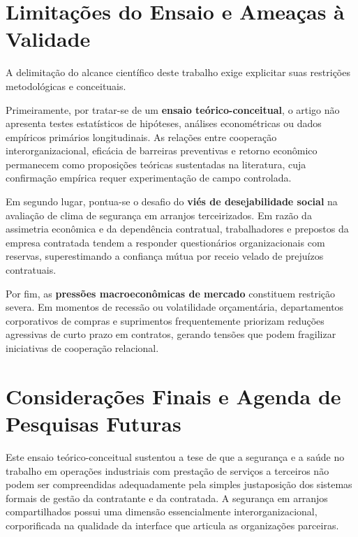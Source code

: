 \documentclass[12pt,a4paper]{article}
\begin{document}
\section{Limitações do Ensaio e Ameaças à Validade}

A delimitação do alcance científico deste trabalho exige explicitar suas restrições metodológicas e conceituais.

Primeiramente, por tratar-se de um \textbf{ensaio teórico-conceitual}, o artigo não apresenta testes estatísticos de hipóteses, análises econométricas ou dados empíricos primários longitudinais. As relações entre cooperação interorganizacional, eficácia de barreiras preventivas e retorno econômico permanecem como proposições teóricas sustentadas na literatura, cuja confirmação empírica requer experimentação de campo controlada.

Em segundo lugar, pontua-se o desafio do \textbf{viés de desejabilidade social} na avaliação de clima de segurança em arranjos terceirizados. Em razão da assimetria econômica e da dependência contratual, trabalhadores e prepostos da empresa contratada tendem a responder questionários organizacionais com reservas, superestimando a confiança mútua por receio velado de prejuízos contratuais.

Por fim, as \textbf{pressões macroeconômicas de mercado} constituem restrição severa. Em momentos de recessão ou volatilidade orçamentária, departamentos corporativos de compras e suprimentos frequentemente priorizam reduções agressivas de curto prazo em contratos, gerando tensões que podem fragilizar iniciativas de cooperação relacional.

\section{Considerações Finais e Agenda de Pesquisas Futuras}

Este ensaio teórico-conceitual sustentou a tese de que a segurança e a saúde no trabalho em operações industriais com prestação de serviços a terceiros não podem ser compreendidas adequadamente pela simples justaposição dos sistemas formais de gestão da contratante e da contratada. A segurança em arranjos compartilhados possui uma dimensão essencialmente interorganizacional, corporificada na qualidade da interface que articula as organizações parceiras.
\end{document}
